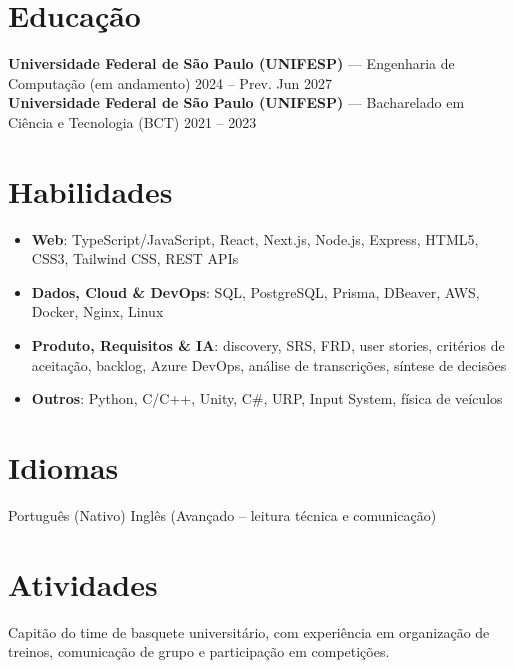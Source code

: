 \documentclass[a4paper,10pt]{article}
\begin{document}
\section*{Educação}
\textbf{Universidade Federal de São Paulo (UNIFESP)} --- Engenharia de Computação (em andamento) \hfill 2024 -- Prev. Jun 2027 \\
\textbf{Universidade Federal de São Paulo (UNIFESP)} --- Bacharelado em Ciência e Tecnologia (BCT) \hfill 2021 -- 2023

\section*{Habilidades}
\begin{itemize}
    \item \textbf{Web}: TypeScript/JavaScript, React, Next.js, Node.js, Express, HTML5, CSS3, Tailwind CSS, REST APIs
    \item \textbf{Dados, Cloud \& DevOps}: SQL, PostgreSQL, Prisma, DBeaver, AWS, Docker, Nginx, Linux
    \item \textbf{Produto, Requisitos \& IA}: discovery, SRS, FRD, user stories, critérios de aceitação, backlog, Azure DevOps, análise de transcrições, síntese de decisões
    \item \textbf{Outros}: Python, C/C++, Unity, C\#, URP, Input System, física de veículos
\end{itemize}

\section*{Idiomas}
Português (Nativo) \textbar{} Inglês (Avançado -- leitura técnica e comunicação)

\section*{Atividades}
Capitão do time de basquete universitário, com experiência em organização de treinos, comunicação de grupo e participação em competições.
\end{document}
